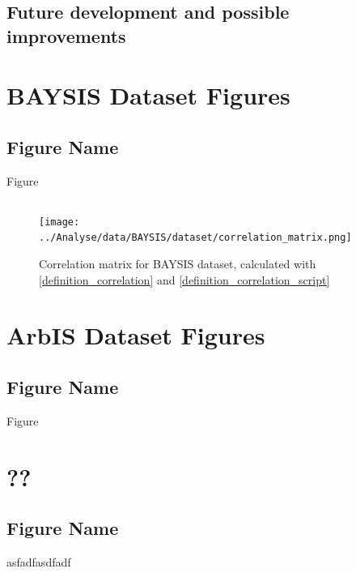 \documentclass[a4paper,12pt]{report}
\begin{document}
\section{Future development and possible improvements} 



{}

\listoffigures

\listoftables

\printglossary[title=List of Acronyms, type=\acronymtype]

\printglossary[title=List of Terms]

\begin{appendices}

\chapter{BAYSIS Dataset Figures}
\section{Figure Name}
\label{appendixA1}
Figure


\section{}
\label{appendix_correlation_matrix_dataset}
\begin{figure}[H]
	\centering
	\texttt{[image: ../Analyse/data/BAYSIS/dataset/correlation\_matrix.png]}
	\caption{Correlation matrix for BAYSIS dataset, calculated with \ref{definition_correlation} and \ref{definition_correlation_script}}
	\label{img:appendix_correlation_matrix_dataset}
\end{figure}


\chapter{ArbIS Dataset Figures}
\section{Figure Name}
Figure


\chapter{??}
\section{Figure Name}
asfadfasdfadf

\end{appendices}
\end{document}
